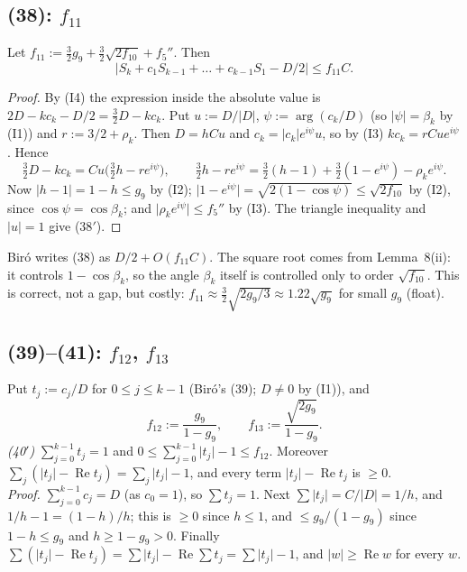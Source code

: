 \documentclass[11pt]{amsart}
\theoremstyle{remark}
\theoremstyle{plain}
\newcommand{\abs}[1]{\lvert #1\rvert}
\DeclareMathOperator{\re}{Re}
\begin{document}
\subsection{(38): \texorpdfstring{$f_{11}$}{f11}}\label{app:38}
Let $f_{11}:=\frac32g_9+\frac32\sqrt{2f_{10}}+f_5''$. Then
\begin{equation}\tag{38$'$}
\bigl|S_k+c_1S_{k-1}+\dots+c_{k-1}S_1-D/2\bigr|\le f_{11}C .
\end{equation}
\begin{proof}
By (I4) the expression inside the absolute value is $2D-kc_k-D/2=\frac32D-kc_k$. Put $u:=D/\abs D$, $\psi:=\arg(c_k/D)$ (so $\abs\psi=\beta_k$ by (I1)) and $r:=3/2+\rho_k$. Then $D=hCu$ and $c_k=\abs{c_k}e^{i\psi}u$, so by (I3) $kc_k=rCue^{i\psi}$. Hence
\[
\tfrac32D-kc_k=Cu\bigl(\tfrac32h-re^{i\psi}\bigr),\qquad \tfrac32h-re^{i\psi}=\tfrac32(h-1)+\tfrac32(1-e^{i\psi})-\rho_ke^{i\psi}.
\]
Now $\abs{h-1}=1-h\le g_9$ by (I2); $\abs{1-e^{i\psi}}=\sqrt{2(1-\cos\psi)}\le\sqrt{2f_{10}}$ by (I2), since $\cos\psi=\cos\beta_k$; and $\abs{\rho_ke^{i\psi}}\le f_5''$ by (I3). The triangle inequality and $\abs u=1$ give (38$'$).
\end{proof}
Bir\'o writes (38) as $D/2+O(f_{11}C)$. The square root comes from Lemma~8(ii): it controls $1-\cos\beta_k$, so the angle $\beta_k$ itself is controlled only to order $\sqrt{f_{10}}$. This is correct, not a gap, but costly: $f_{11}\approx\frac32\sqrt{2g_9/3}\approx1.22\sqrt{g_9}$ for small $g_9$ (float).

\subsection{(39)--(41): \texorpdfstring{$f_{12}$, $f_{13}$}{f12, f13}}\label{app:39}
Put $t_j:=c_j/D$ for $0\le j\le k-1$ (Bir\'o's (39); $D\ne0$ by (I1)), and
\[
f_{12}:=\frac{g_9}{1-g_9},\qquad f_{13}:=\frac{\sqrt{2g_9}}{1-g_9}.
\]
\emph{(40$'$)} $\sum_{j=0}^{k-1}t_j=1$ and $0\le\sum_{j=0}^{k-1}\abs{t_j}-1\le f_{12}$. Moreover $\sum_j(\abs{t_j}-\re t_j)=\sum_j\abs{t_j}-1$, and every term $\abs{t_j}-\re t_j$ is $\ge0$. \\
\emph{Proof.} $\sum_{j=0}^{k-1}c_j=D$ (as $c_0=1$), so $\sum t_j=1$. Next $\sum\abs{t_j}=C/\abs D=1/h$, and $1/h-1=(1-h)/h$; this is $\ge0$ since $h\le1$, and $\le g_9/(1-g_9)$ since $1-h\le g_9$ and $h\ge1-g_9>0$. Finally $\sum(\abs{t_j}-\re t_j)=\sum\abs{t_j}-\re\sum t_j=\sum\abs{t_j}-1$, and $\abs w\ge\re w$ for every $w$.
\end{document}
